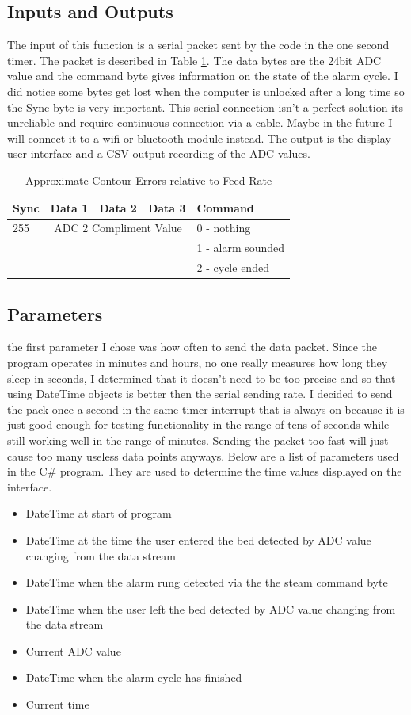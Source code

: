 \documentclass[11pt]{article}
\begin{document}
\subsection*{Inputs and Outputs}
The input of this function is a serial packet sent by the code in the one second timer. 
The packet is described in Table \ref{tab:packet}.
The data bytes are the 24bit ADC value and the command byte gives information on the state of the alarm cycle. 
I did notice some bytes get lost when the computer is unlocked after a long time so the Sync byte is very important.
This serial connection isn't a perfect solution its unreliable and require continuous connection via a cable. 
Maybe in the future I will connect it to a wifi or bluetooth module instead.
The output is the display user interface and a CSV output recording of the ADC values. 
\begin{table}[H]
	\centering
	\caption{Approximate Contour Errors relative to Feed Rate}
	\label{tab:packet}
	\begin{tabular}{|l|l|l|l|l|}
		\hline
		Sync  & Data 1 & Data 2 & Data 3 &Command \\
		\hline
		255 &  \multicolumn{3}{c|}{ADC 2 Compliment Value}  & 0 - nothing  \\
		 &  \multicolumn{3}{c|}{}  & 	1 - alarm sounded \\
		 &  \multicolumn{3}{c|}{}  &	2 - cycle ended \\
		\hline	
	\end{tabular}
\end{table}
\subsection*{Parameters}
the first parameter I chose was how often to send the data packet.
Since the program operates in minutes and hours, no one really measures how long they sleep in seconds, I determined that it doesn't need to be too precise and so that using DateTime objects is better then the serial sending rate.    
I decided to send the pack once a second in the same timer interrupt that is always on because it is just good enough for testing functionality in the range of tens of seconds while still working well in the range of minutes. 
Sending the packet too fast will just cause too many useless data points anyways.
Below are a list of parameters used in the C\# program. 
They are used to determine the time values displayed on the interface. 
\begin{itemize}
	\item DateTime at start of program
	\item DateTime at the time the user entered the bed detected by ADC value changing from the data stream
	\item DateTime when the alarm rung detected via the the steam command byte
	\item DateTime when the user left the bed detected by ADC value changing from the data stream
	\item Current ADC value 
	\item DateTime when the alarm cycle has finished
	\item Current time
\end{itemize}
\end{document}
